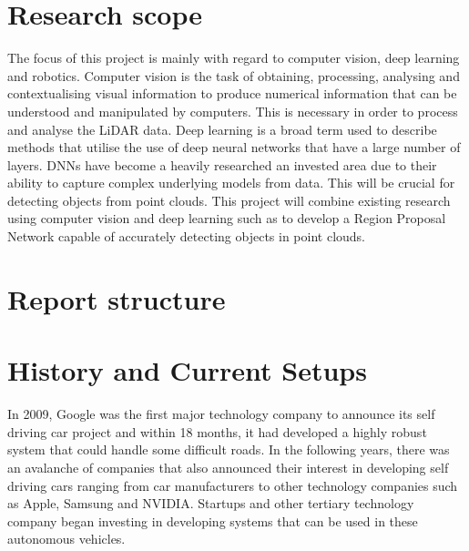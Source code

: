 \section{Research scope}
The focus of this project is mainly with regard to computer vision, deep learning and robotics. Computer vision is the task of obtaining, processing, analysing and contextualising visual information to produce numerical information that can be understood and manipulated by computers. This is necessary in order to process and analyse the LiDAR data. Deep learning is a broad term used to describe methods that utilise the use of deep neural networks that have a large number of layers. DNNs have become a heavily researched an invested area due to their ability to capture complex underlying models from data. This will be crucial for detecting objects from point clouds. 
This project will combine existing research using computer vision and deep learning such as \cite{qi2017pointnet}\cite{zhou2017voxelnet} to develop a Region Proposal Network capable of accurately detecting objects in point clouds. 

\section{Report structure}



\section{History and Current Setups}

In 2009, Google was the first major technology company to announce its self driving car project and within 18 months, it had developed a highly robust system that could handle some difficult roads. In the following years, there was an avalanche of companies that also announced their interest in developing self driving cars ranging from car manufacturers to other technology companies such as Apple, Samsung and NVIDIA.
Startups and other tertiary technology company began investing in developing systems that can be used in these autonomous vehicles. 

